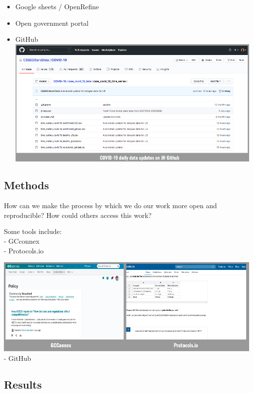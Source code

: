 \documentclass[
]{book}
\providecommand{\tightlist}{%
  \setlength{\itemsep}{0pt}\setlength{\parskip}{0pt}}
\begin{document}
\begin{itemize}
\tightlist
\item
  Google sheets / OpenRefine\\
\item
  Open government portal\\
\item
  GitHub\\
  \includegraphics{rr-presentation-figure/Covid.png}
\end{itemize}

\hypertarget{methods}{%
\subsection{Methods}\label{methods}}

How can we make the process by which we do our work more open and reproducible? How could others access this work?

Some tools include:\\
- GCconnex\\
- Protocols.io

\includegraphics{rr-presentation-figure/methods.png}
- GitHub

\hypertarget{results}{%
\subsection{Results}\label{results}}
\end{document}
